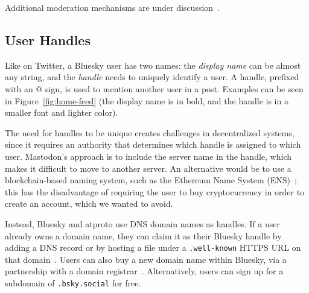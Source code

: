 \documentclass[sigconf,review]{acmart}
\begin{document}
Additional moderation mechanisms are under discussion~\cite{Moderation}.

\subsection{User Handles}\label{sec:handles}

Like on Twitter, a Bluesky user has two names: the \emph{display name} can be almost any string, and the \emph{handle} needs to uniquely identify a user.
A handle, prefixed with an @ sign, is used to mention another user in a post.
Examples can be seen in Figure~\ref{fig:home-feed} (the display name is in bold, and the handle is in a smaller font and lighter color).

The need for handles to be unique creates challenges in decentralized systems, since it requires an authority that determines which handle is assigned to which user.
Mastodon's approach is to include the server name in the handle, which makes it difficult to move to another server.
An alternative would be to use a blockchain-based naming system, such as the Ethereum Name System (ENS)~\cite{ENS}; this has the disadvantage of requiring the user to buy cryptocurrency in order to create an account, which we wanted to avoid.

Instead, Bluesky and atproto use DNS domain names as handles.
If a user already owns a domain name, they can claim it as their Bluesky handle by adding a DNS record or by hosting a file under a \texttt{.well-known} HTTPS URL on that domain~\cite{DomainHandle}.
Users can also buy a new domain name within Bluesky, via a partnership with a domain registrar~\cite{PurchaseDomain}.
Alternatively, users can sign up for a subdomain of \texttt{.bsky.social} for free.
\end{document}
